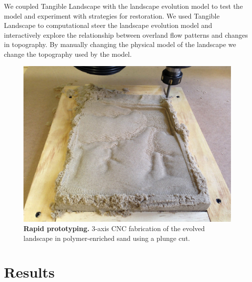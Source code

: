 \documentclass[final,3p,times,twocolumn]{elsarticle}
\begin{document}
We coupled Tangible Landscape with the landscape evolution model to test the model and experiment with strategies for restoration. 
We used Tangible Landscape to computational steer the landscape evolution model and interactively explore the relationship between overland flow patterns and changes in topography. By manually changing the physical model of the landscape 
we change the topography used by the model.

\begin{figure}
\centering
\includegraphics[width=\textwidth]{images/cnc_sand.jpg}
\caption{{\bf Rapid prototyping.}
3-axis CNC fabrication of the evolved landscape in polymer-enriched sand using a plunge cut.}
\label{fig:cnc_sand}
\end{figure}




\section{Results}
\end{document}

